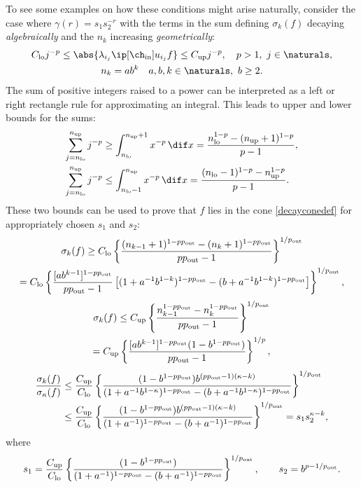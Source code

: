 \documentclass[final]{elsarticle}
\newcommand{\chin}{\ch_{\text{\rm{in}}}}
\newcommand{\pout}{p_{\text{\rm{out}}}}
\theoremstyle{definition}
\theoremstyle{remark}
\DeclareMathOperator{\up}{up}
\DeclareMathOperator{\lo}{lo}
\begin{document}
To see some examples on how these conditions might arise naturally, consider the case where $\gamma(r)=s_1s_2^{-r}$ with the terms in the sum defining $\sigma_k(f)$ decaying \emph{algebraically} and the $n_k$ increasing \emph{geometrically}:
\begin{gather*}
C_{\lo} j^{-p} \le \abs{\lambda_{i_j} \ip[\chin]{u_{i_j}}{f}} \le C_{\up} j^{-p}, \quad  p>1, \ j \in \naturals, \\
n_k = a b^k  \quad a, b, k \in \naturals, \ b \ge 2.
\end{gather*}
The sum of positive integers raised to a power can be interpreted as a left or right rectangle rule for approximating an integral.  This leads to upper and lower bounds for the sums:
\begin{align*}
\sum_{j=n_{\lo}}^{n_{\up}} j^{-p}  & \ge \int_{n_{\lo}}^{n_{\up}+1} x^{-p}\, \dif x  = \frac{n_{\lo} ^{1-p} - (n_{\up}+1)^{1-p}}{p-1}, \\
\sum_{j=n_{\lo}}^{n_{\up}} j^{-p}  & \le \int_{n_{\lo}-1}^{n_{\up}} x^{-p}\, \dif x = \frac{(n_{\lo}-1) ^{1-p} - n_{\up}^{1-p}}{p-1}.
\end{align*}
These two bounds can be used to prove that $f$ lies in the cone \eqref{decayconedef} for appropriately chosen $s_1$ and $s_2$:
\begin{multline*}
\sigma_k(f) \ge C_{\lo} \left\{\frac{(n_{k-1}+1) ^{1-p\pout} - (n_{k}+1)^{1-p \pout}}{p \pout-1}\right\}^{1/\pout} \\
= C_{\lo} \left\{\frac{[ab^{k-1}]^{1-p \pout}}{p \pout-1} \left[(1+a^{-1}b^{1-k})^{1-p \pout} - (b+a^{-1}b^{1-k})^{1-p \pout}\right] \right\}^{1/\pout},
\end{multline*}
\begin{multline*}
\sigma_k(f) \le C_{\up}\left\{\frac{n_{k-1} ^{1-p \pout} - n_{k}^{1-p \pout}}{p \pout-1}\right\}^{1/\pout} \\
= C_{\up}\left\{\frac{[ab^{k-1}]^{1-p \pout} (1 - b^{1-p \pout})}{p \pout-1}\right\}^{1/p} ,
\end{multline*}
\begin{align*}
\frac{\sigma_k(f)}{\sigma_\kappa(f)} &\le \frac{C_{\up}}  {C_{\lo}}
\left\{\frac{ (1 - b^{1-p \pout}) b^{(p \pout-1)(\kappa-k)} }  {(1+a^{-1}b^{1-\kappa})^{1-p\pout} - (b+a^{-1}b^{1-\kappa})^{1-p\pout}} \right\}^{1/\pout}\\
& \le \frac{C_{\up}}  {C_{\lo}}
\left\{\frac{(1 - b^{1-p\pout}) b^{(p\pout-1)(\kappa-k)} }  {(1+a^{-1})^{1-p\pout} - (b+a^{-1})^{1-p\pout}} \right\}^{1/\pout}   = s_1 s_2^{\kappa-k},
\end{align*}
where
\[
s_1 = \frac{ C_{\up}}  {C_{\lo}}\left\{\frac{(1 - b^{1-p\pout})}  {(1+a^{-1})^{1-p\pout} - (b+a^{-1})^{1-p\pout} } \right\}^{1/\pout}, \qquad s_2 = b^{p-1/\pout}.
\]
\end{document}
